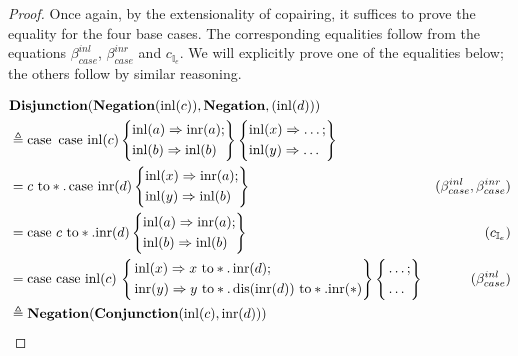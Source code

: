 \begin{proof}

  Once again, by the extensionality of copairing, it suffices to prove the equality for the four base cases. The corresponding equalities follow from the equations 
\(\beta_{case}^{inl}\), \(\beta_{case}^{inr}\) and \(c_{\mathbb{I}_e}\). 
We will explicitly prove one of the equalities below; the others follow by similar reasoning.

\begin{equation*}
  \begin{split}
  & \textbf{Disjunction} (\textbf{Negation} (\mathrm{inl}(c)), \textbf{Negation}, (\mathrm{inl}(d))) \\ 
  & \triangleq \text{case }  \, 
    \text{case } \mathrm{inl}(c)  
    \left\{ \begin{aligned}
    & \mathrm{inl}(a) \Rightarrow \mathrm{inr}(a); \\
    & \mathrm{inl}(b) \Rightarrow \mathrm{inl}(b) 
  \end{aligned}  \right\}  
   \left\{ \begin{aligned}
    & \mathrm{inl}(x) \Rightarrow  \ldots ; \\
    & \mathrm{inl}(y) \Rightarrow  \ldots
   \end{aligned} \right\} \\
   &  =  c \text{ to} *. \, \text{case } \mathrm{inr}(d)  
    \left\{ \begin{aligned}
    & \mathrm{inl}(x) \Rightarrow \mathrm{inr}(a); \\
    & \mathrm{inl}(y) \Rightarrow \mathrm{inl}(b) 
  \end{aligned}  \right\}   & (\beta_{case}^{inl},\beta_{case}^{inr}) \\
  & =  \text{case } c \text{ to} *. \mathrm{inr}(d)  
    \left\{ \begin{aligned}
    & \mathrm{inl}(a) \Rightarrow \mathrm{inr}(a); \\
    & \mathrm{inl}(b) \Rightarrow \mathrm{inl}(b) 
  \end{aligned}  \right\}    & (c_{\mathbb{I}_e})\\
  & = \text{case }  \text{case } \mathrm{inl}(c)\,
  \left\{
    \begin{aligned}
    &\mathrm{inl}(x) \Rightarrow x \text{ to} *. \, \mathrm{inr}(d) ;\\
  \,& \mathrm{inr}(y) \Rightarrow y \text{ to} *. \,  \text{dis}(\mathrm{inr}(d)) \text{ to} *. \mathrm{inr}(*)
  \end{aligned} 
  \right\} \left\{ \begin{aligned}
    &  \ldots; \\
    & \ldots
  \end{aligned}  \right\} & (\beta_{case}^{inl})\\
  & \triangleq \textbf{Negation}(\textbf{Conjunction} (\mathrm{inl}(c), \mathrm{inr}(d))) \\
  \end{split}
\end{equation*}

\end{proof}

